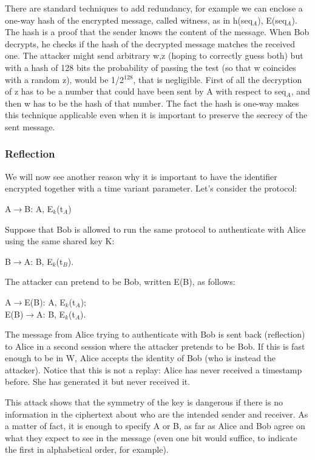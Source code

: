\documentclass[a4paper, 12pt]{report}
\begin{document}
There are standard techniques to add redundancy, for example we can enclose a one-way hash of the encrypted message, called witness, as in h(seq$_A$), E(seq$_A$). The hash is a proof that the sender knows the content of the message. When Bob decrypts, he checks if the hash of the decrypted message matches the received one. The attacker might send arbitrary w,z (hoping to correctly guess both) but with a hash of 128 bits the probability of passing the test (so that w coincides with a random z), would be 1/2$^{128}$, that is negligible. First of all the decryption of z has to be a number that could have been sent by A with respect to seq$_A$, and then w has to be the hash of that number. The fact the hash is one-way makes this technique applicable even when it is important to preserve the secrecy of the sent message.

\subsubsection{Reflection}
We will now see another reason why it is important to have the identifier encrypted together with a time variant parameter. Let's consider the protocol:
\begin{center}
	A$\rightarrow$B: A, E$_k$(t$_A$)
\end{center}

Suppose that Bob is allowed to run the same protocol to authenticate with Alice using the same shared key K:
\begin{center}
	B$\rightarrow$A: B, E$_k$(t$_B$).
\end{center}

The attacker can pretend to be Bob, written E(B), as follows:
\begin{center}
	A$\rightarrow$E(B): A, E$_k$(t$_A$);\\
	E(B)$\rightarrow$A: B, E$_k$(t$_A$).
\end{center}

The message from Alice trying to authenticate with Bob is sent back (reflection) to Alice in a second session where the attacker pretends to be Bob. If this is fast enough to be in W, Alice accepts the identity of Bob (who is instead the attacker). Notice that this is not a replay: Alice has never received a timestamp before. She has generated it but never received it.

This attack shows that the symmetry of the key is dangerous if there is no information in the ciphertext about who are the intended sender and receiver. As a matter of fact, it is enough to specify A or B, as far as Alice and Bob agree on what they expect to see in the message (even one bit would suffice, to indicate the first in alphabetical order, for example).
\end{document}
